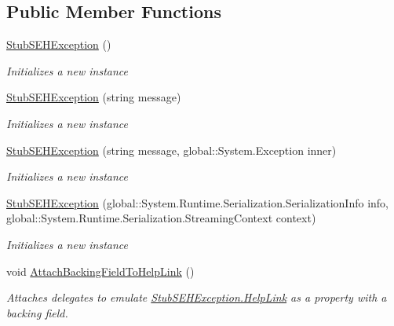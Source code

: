 \subsection*{Public Member Functions}
\begin{DoxyCompactItemize}
\item 
\hyperlink{class_system_1_1_runtime_1_1_interop_services_1_1_fakes_1_1_stub_s_e_h_exception_a3085a068d48cad96005e3a039131cc18}{Stub\-S\-E\-H\-Exception} ()
\begin{DoxyCompactList}\small\item\em Initializes a new instance\end{DoxyCompactList}\item 
\hyperlink{class_system_1_1_runtime_1_1_interop_services_1_1_fakes_1_1_stub_s_e_h_exception_afbf04335991685ffb05e4d14fa1995e9}{Stub\-S\-E\-H\-Exception} (string message)
\begin{DoxyCompactList}\small\item\em Initializes a new instance\end{DoxyCompactList}\item 
\hyperlink{class_system_1_1_runtime_1_1_interop_services_1_1_fakes_1_1_stub_s_e_h_exception_a5af6ecd7bd6580eb3bfd7a01099230e6}{Stub\-S\-E\-H\-Exception} (string message, global\-::\-System.\-Exception inner)
\begin{DoxyCompactList}\small\item\em Initializes a new instance\end{DoxyCompactList}\item 
\hyperlink{class_system_1_1_runtime_1_1_interop_services_1_1_fakes_1_1_stub_s_e_h_exception_a3d77e420286e6ebe666d5cd55e03b41a}{Stub\-S\-E\-H\-Exception} (global\-::\-System.\-Runtime.\-Serialization.\-Serialization\-Info info, global\-::\-System.\-Runtime.\-Serialization.\-Streaming\-Context context)
\begin{DoxyCompactList}\small\item\em Initializes a new instance\end{DoxyCompactList}\item 
void \hyperlink{class_system_1_1_runtime_1_1_interop_services_1_1_fakes_1_1_stub_s_e_h_exception_a2397ac2a8179768f2a815fd1b29ad0a9}{Attach\-Backing\-Field\-To\-Help\-Link} ()
\begin{DoxyCompactList}\small\item\em Attaches delegates to emulate \hyperlink{class_system_1_1_runtime_1_1_interop_services_1_1_fakes_1_1_stub_s_e_h_exception_a578cb50879327a861e55a2ab3926cdb5}{Stub\-S\-E\-H\-Exception.\-Help\-Link} as a property with a backing field.\end{DoxyCompactList}\item 

\end{DoxyCompactItemize}
